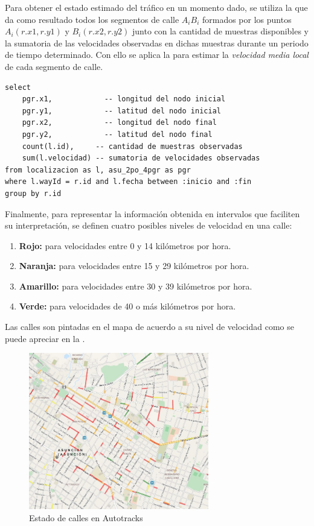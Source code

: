 Para obtener el estado estimado del tráfico en un momento dado, se utiliza la  que da como resultado todos los segmentos de calle $A_iB_i$ formados por los puntos $A_i(r.x1, r.y1)$ y $B_i(r.x2, r.y2)$ junto con la cantidad de muestras disponibles y la sumatoria de las velocidades observadas en dichas muestras durante un periodo de tiempo determinado. Con ello se aplica la  para estimar la \emph{velocidad media local} de cada segmento de calle.

\begin{lstlisting}[float,floatplacement=tbh,caption={Obtención de datos de tráfico}, label={lst:trafico}]
select 
    pgr.x1,            -- longitud del nodo inicial
    pgr.y1,            -- latitud del nodo inicial
    pgr.x2,            -- longitud del nodo final
    pgr.y2,            -- latitud del nodo final
    count(l.id),     -- cantidad de muestras observadas
    sum(l.velocidad) -- sumatoria de velocidades observadas
from localizacion as l, asu_2po_4pgr as pgr
where l.wayId = r.id and l.fecha between :inicio and :fin
group by r.id
\end{lstlisting}

Finalmente, para representar la información obtenida en intervalos que faciliten su interpretación, se definen cuatro posibles niveles de velocidad en una calle:
\begin{enumerate}
\item \textbf{Rojo:}  para velocidades entre 0 y 14 kilómetros por hora.
\item \textbf{Naranja:}  para velocidades entre 15 y 29 kilómetros por hora.
\item \textbf{Amarillo:}  para velocidades entre 30 y 39 kilómetros por hora.
\item \textbf{Verde:}  para velocidades de 40 o más kilómetros por hora.
\end{enumerate}
Las calles son pintadas en el mapa de acuerdo a su nivel de velocidad como se puede apreciar en la .
\begin{figure}[h]
	\centering
	\includegraphics[width=0.7\textwidth]{capitulos/6/figuras/figura3.jpg}
	\caption{\label{fig:calles} Estado de calles en Autotracks}	
\end{figure}
